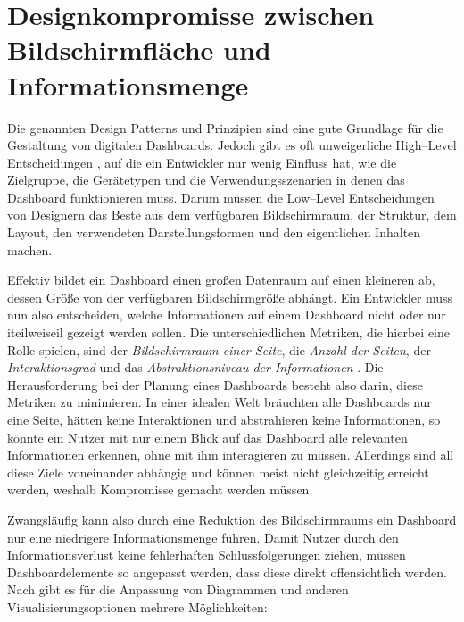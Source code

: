 \section{Designkompromisse zwischen Bildschirmfläche und Informationsmenge}

Die genannten Design Patterns und Prinzipien sind eine gute Grundlage für die Gestaltung von digitalen Dashboards.
Jedoch gibt es oft unweigerliche High--Level Entscheidungen \autocite[S. 6]{Bach.DashboardDesignPatterns.2023}, auf die ein Entwickler nur wenig Einfluss hat, wie die Zielgruppe, die Gerätetypen und die Verwendungsszenarien in denen das Dashboard funktionieren muss.
Darum müssen die Low--Level Entscheidungen von Designern das Beste aus dem verfügbaren Bildschirmraum, der Struktur, dem Layout, den verwendeten Darstellungsformen und den eigentlichen Inhalten machen.

Effektiv bildet ein Dashboard einen großen Datenraum auf einen kleineren ab, dessen Größe von der verfügbaren Bildschirmgröße abhängt.
Ein Entwickler muss nun also entscheiden, welche Informationen auf einem Dashboard nicht oder nur iteilweiseil gezeigt werden sollen.
Die unterschiedlichen Metriken, die hierbei eine Rolle spielen, sind der \emph{Bildschirmraum einer Seite}, die \emph{Anzahl der Seiten}, der \emph{Interaktionsgrad} und das \emph{Abstraktionsniveau der Informationen} \autocite[S. 6]{Bach.DashboardDesignPatterns.2023}.
Die Herausforderung bei der Planung eines Dashboards besteht also darin, diese Metriken zu minimieren.
In einer idealen Welt bräuchten alle Dashboards nur eine Seite, hätten keine Interaktionen und abstrahieren keine Informationen, so könnte ein Nutzer mit nur einem Blick auf das Dashboard alle relevanten Informationen erkennen, ohne mit ihm interagieren zu müssen.
Allerdings sind all diese Ziele voneinander abhängig und können meist nicht gleichzeitig erreicht werden, weshalb Kompromisse gemacht werden müssen.

Zwangsläufig kann also durch eine Reduktion des Bildschirmraums ein Dashboard nur eine niedrigere Informationsmenge führen.
Damit Nutzer durch den Informationsverlust keine fehlerhaften Schlussfolgerungen ziehen, müssen Dashboardelemente so angepasst werden, dass diese direkt offensichtlich werden.
Nach \autocite[S. 463--464]{Kim.DesignPatternTradeOffs.2021} gibt es für die Anpassung von Diagrammen und anderen Visualisierungsoptionen mehrere Möglichkeiten:


